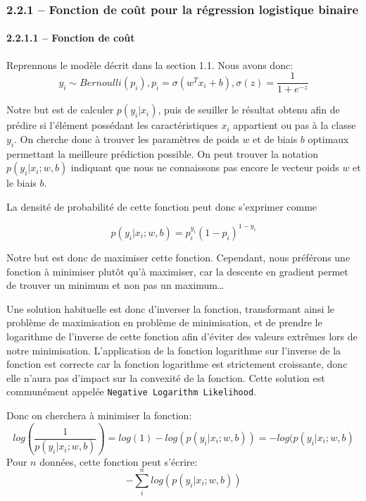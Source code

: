 \documentclass[
]{article}
\begin{document}
\hypertarget{fonction-de-couxfbt-pour-la-ruxe9gression-logistique-binaire}{%
\subsubsection{2.2.1 -- Fonction de coût pour la régression logistique
binaire}\label{fonction-de-couxfbt-pour-la-ruxe9gression-logistique-binaire}}

\hypertarget{fonction-de-couxfbt}{%
\paragraph{2.2.1.1 -- Fonction de coût}\label{fonction-de-couxfbt}}

Reprennons le modèle décrit dans la section 1.1. Nous avons donc:
\[y_i \sim Bernoulli(p_i), p_i = \sigma(w^T x_i + b), \sigma(z) = \frac{1}{1+e^{-z}}\]

Notre but est de calculer \(p(y_i | x_i)\), puis de seuiller le résultat
obtenu afin de prédire si l'élément possédant les caractéristiques
\(x_i\) appartient ou pas à la classe \(y_i\). On cherche donc à trouver
les paramètres de poids \(w\) et de biais \(b\) optimaux permettant la
meilleure prédiction possible. On peut trouver la notation
\(p(y_i|x_i;w, b)\) indiquant que nous ne connaissons pas encore le
vecteur poids \(w\) et le biais \(b\).

La densité de probabilité de cette fonction peut donc s'exprimer comme

\[p(y_i|x_i; w, b) = p_i^{y_i}(1 - p_i)^{1 - y_i}\]

Notre but est donc de maximiser cette fonction. Cependant, nous
préférons une fonction à minimiser plutôt qu'à maximiser, car la
descente en gradient permet de trouver un minimum et non pas un
maximum\ldots{}

Une solution habituelle est donc d'inverser la fonction, transformant
ainsi le problème de maximisation en problème de minimisation, et de
prendre le logarithme de l'inverse de cette fonction afin d'éviter des
valeurs extrêmes lors de notre minimisation. L'application de la
fonction logarithme sur l'inverse de la fonction est correcte car la
fonction logarithme est strictement croissante, donc elle n'aura pas
d'impact sur la convexité de la fonction. Cette solution est communément
appelée \texttt{Negative\ Logarithm\ Likelihood}.

Donc on cherchera à minimiser la fonction:
\[log\left(\frac{1}{p(y_i|x_i;w,b)}\right) = log(1) - log(p(y_i|x_i;w,b)) = -log(p(y_i|x_i; w, b)\]
Pour \(n\) données, cette fonction peut s'écrire:
\[-\sum_i^n log(p(y_i|x_i;w,b))\]
\end{document}
